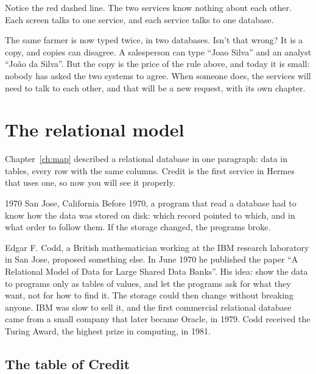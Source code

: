 Notice the red dashed line. The two services know nothing about each other.
Each screen talks to one service, and each service talks to one database.

\begin{reflection}{The same farmer is now typed twice, in two databases. Isn't that wrong?}
It is a copy, and copies can disagree. A salesperson can type ``Joao Silva''
and an analyst ``João da Silva''. But the copy is the price of the rule above,
and today it is small: nobody has asked the two systems to agree. When
someone does, the services will need to talk to each other, and that will be
a new request, with its own chapter.
\end{reflection}

\section{The relational model}

Chapter~\ref{ch:map} described a relational database in one paragraph: data
in tables, every row with the same columns. Credit is the first service in
Hermes that uses one, so now you will see it properly.

\begin{history}{1970 \textperiodcentered{} San Jose, California}
Before 1970, a program that read a database had to know how the data was
stored on disk: which record pointed to which, and in what order to follow
them. If the storage changed, the programs broke.

Edgar F. Codd, a British mathematician working at the IBM research
laboratory in San Jose, proposed something else. In June 1970 he published
the paper ``A Relational Model of Data for Large Shared Data Banks''. His
idea: show the data to programs only as tables of values, and let the
programs ask for what they want, not for how to find it. The storage could
then change without breaking anyone. IBM was slow to sell it, and the first
commercial relational database came from a small company that later became
Oracle, in 1979. Codd received the Turing Award, the highest prize in
computing, in 1981.
\end{history}

\subsection*{The table of Credit}

